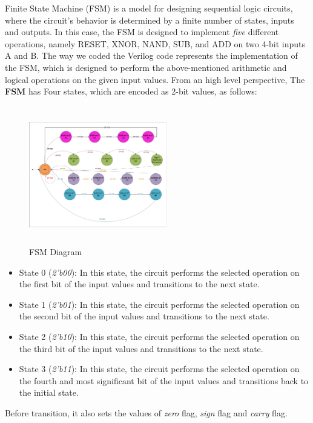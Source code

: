 Finite State Machine (FSM) is a model for designing sequential logic circuits,
where the circuit's behavior is determined by a finite number of states, inputs and outputs.
In this case, the FSM is designed to implement \textit{five} different operations,
namely RESET, XNOR, NAND, SUB, and ADD on two 4-bit inputs A and B.
The way we coded the Verilog code represents the implementation of the FSM,
which is designed to perform the above-mentioned arithmetic and logical operations on the given input values.
From an high level perspective, The \textbf{FSM} has Four states, which are encoded as 2-bit values, as follows:

\begin{figure}[H]
    \centerline{\includegraphics[height=6cm,width=6cm]{figures/FSM}}
    \caption{FSM Diagram}
    \label{fig:FSM}
\end{figure}

\begin{itemize}
    \item State 0 (\textit{2'b00}): In this state, the circuit performs the selected operation on the first bit of the input values and transitions to the next state.
    \item State 1 (\textit{2'b01}): In this state, the circuit performs the selected operation on the second bit of the input values and transitions to the next state.
    \item State 2 (\textit{2'b10}): In this state, the circuit performs the selected operation on the third bit of the input values and transitions to the next state.
    \item State 3 (\textit{2'b11}): In this state, the circuit performs the selected operation on the fourth and most significant bit of the input values and transitions back to the initial state.
\end{itemize}

Before transition, it also sets the values of \textit{zero} flag, \textit{sign} flag and \textit{carry} flag.


